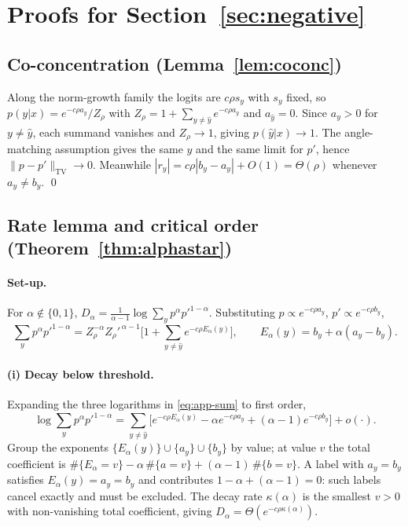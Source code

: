 \documentclass[10pt,letterpaper,twocolumn]{article}
\newcommand{\Dalpha}{D_{\alpha}}
\newcommand{\TV}{\mathrm{TV}}
\theoremstyle{plain}
\theoremstyle{definition}
\theoremstyle{remark}
\begin{document}
\section{Proofs for Section~\ref{sec:negative}}
\label{app:neg}

\subsection{Co-concentration (Lemma~\ref{lem:coconc})}

Along the norm-growth family the logits are $c\rho s_{y}$ with $s_{y}$ fixed,
so $p(y|x)=e^{-c\rho a_{y}}/Z_{\rho}$ with
$Z_{\rho}=1+\sum_{y\neq\hat y}e^{-c\rho a_{y}}$ and $a_{\hat y}=0$. Since
$a_{y}>0$ for $y\neq\hat y$, each summand vanishes and $Z_{\rho}\to1$, giving
$p(\hat y|x)\to1$. The angle-matching assumption gives the same $\hat y$ and
the same limit for $p'$, hence
$\|p-p'\|_{\TV}\to0$. Meanwhile
$|r_{y}|=c\rho|b_{y}-a_{y}|+O(1)=\Theta(\rho)$ whenever $a_{y}\neq b_{y}$.
\qed

\subsection{Rate lemma and critical order (Theorem~\ref{thm:alphastar})}

\paragraph{Set-up.}
For $\alpha\notin\{0,1\}$,
$\Dalpha=\frac{1}{\alpha-1}\log\sum_{y}p^{\alpha}p'^{1-\alpha}$. Substituting
$p\propto e^{-c\rho a_{y}}$, $p'\propto e^{-c\rho b_{y}}$,
\begin{equation}
\sum_{y}p^{\alpha}p'^{1-\alpha}
= Z_{\rho}^{-\alpha}Z_{\rho}'^{\,\alpha-1}
  \Big[1+\sum_{y\neq\hat y}e^{-c\rho E_{\alpha}(y)}\Big],
\qquad E_{\alpha}(y)=b_{y}+\alpha(a_{y}-b_{y}).
\label{eq:app-sum}
\end{equation}

\paragraph{(i) Decay below threshold.}
Expanding the three logarithms in \eqref{eq:app-sum} to first order,
\[
\log\textstyle\sum_{y}p^{\alpha}p'^{1-\alpha}
=\sum_{y\neq\hat y}\Big[e^{-c\rho E_{\alpha}(y)}
  -\alpha e^{-c\rho a_{y}}+(\alpha-1)e^{-c\rho b_{y}}\Big]+o(\cdot).
\]
Group the exponents $\{E_{\alpha}(y)\}\cup\{a_{y}\}\cup\{b_{y}\}$ by value; at
value $v$ the total coefficient is
$\#\{E_{\alpha}=v\}-\alpha\,\#\{a=v\}+(\alpha-1)\,\#\{b=v\}$. A label with
$a_{y}=b_{y}$ satisfies $E_{\alpha}(y)=a_{y}=b_{y}$ and contributes
$1-\alpha+(\alpha-1)=0$: such labels cancel exactly and must be excluded.
The decay rate $\kappa(\alpha)$ is the smallest $v>0$ with non-vanishing total
coefficient, giving $\Dalpha=\Theta(e^{-c\rho\kappa(\alpha)})$.
\end{document}

